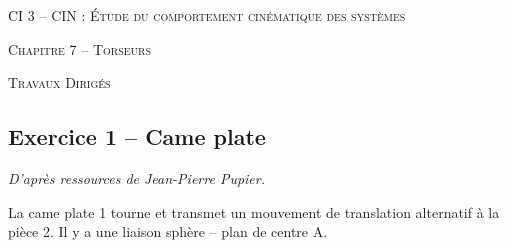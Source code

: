 \documentclass[10pt,oneside]{article}
\begin{document}
\pagestyle{fancy}
\renewcommand{\headrulewidth}{0pt}

\fancyhead{}

\fancyhead[C]{\rule{12cm}{.5pt}}


\renewcommand{\footrulewidth}{0.2pt}

\fancyfoot[C]{\footnotesize{\bfseries \thepage}}





\begin{center}
 \Large\textsc{CI 3 -- CIN : Étude du comportement cinématique des systèmes}
\end{center}

\begin{center}
 \large\textsc{Chapitre 7 -- Torseurs}
\end{center}

\begin{center}
\textsc{Travaux Dirigés} 
\end{center}

\vspace{.5cm}

\subsection*{Exercice 1 -- Came plate}
\setcounter{subparagraph}{0}
\begin{flushright}
\textit{D'après ressources de Jean-Pierre Pupier.} 
\end{flushright}
La came plate 1 tourne et transmet un mouvement de translation alternatif à la pièce 2. Il y a une liaison sphère -- plan de centre A.
\end{document}
